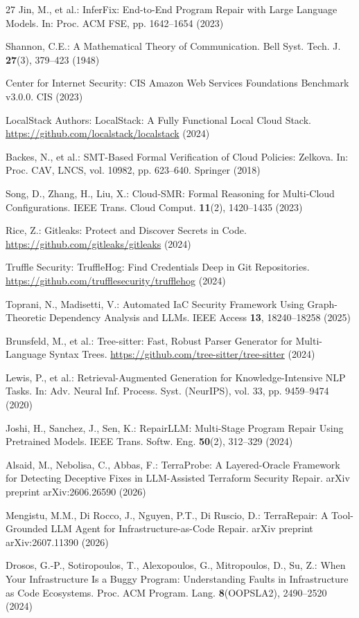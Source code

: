 \documentclass[runningheads]{llncs}
\begin{document}
\begin{thebibliography}{27}
Jin, M., et al.: InferFix: End-to-End Program Repair with Large Language Models. In: Proc. ACM FSE, pp. 1642--1654 (2023)

Shannon, C.E.: A Mathematical Theory of Communication. Bell Syst. Tech. J. \textbf{27}(3), 379--423 (1948)

Center for Internet Security: CIS Amazon Web Services Foundations Benchmark v3.0.0. CIS (2023)

LocalStack Authors: LocalStack: A Fully Functional Local Cloud Stack. \url{https://github.com/localstack/localstack} (2024)

Backes, N., et al.: SMT-Based Formal Verification of Cloud Policies: Zelkova. In: Proc. CAV, LNCS, vol. 10982, pp. 623--640. Springer (2018)

Song, D., Zhang, H., Liu, X.: Cloud-SMR: Formal Reasoning for Multi-Cloud Configurations. IEEE Trans. Cloud Comput. \textbf{11}(2), 1420--1435 (2023)

Rice, Z.: Gitleaks: Protect and Discover Secrets in Code. \url{https://github.com/gitleaks/gitleaks} (2024)

Truffle Security: TruffleHog: Find Credentials Deep in Git Repositories. \url{https://github.com/trufflesecurity/trufflehog} (2024)

Toprani, N., Madisetti, V.: Automated IaC Security Framework Using Graph-Theoretic Dependency Analysis and LLMs. IEEE Access \textbf{13}, 18240--18258 (2025)

Brunsfeld, M., et al.: Tree-sitter: Fast, Robust Parser Generator for Multi-Language Syntax Trees. \url{https://github.com/tree-sitter/tree-sitter} (2024)

Lewis, P., et al.: Retrieval-Augmented Generation for Knowledge-Intensive NLP Tasks. In: Adv. Neural Inf. Process. Syst. (NeurIPS), vol. 33, pp. 9459--9474 (2020)

Joshi, H., Sanchez, J., Sen, K.: RepairLLM: Multi-Stage Program Repair Using Pretrained Models. IEEE Trans. Softw. Eng. \textbf{50}(2), 312--329 (2024)

Alsaid, M., Nebolisa, C., Abbas, F.: TerraProbe: A Layered-Oracle Framework for Detecting Deceptive Fixes in LLM-Assisted Terraform Security Repair. arXiv preprint arXiv:2606.26590 (2026)

Mengistu, M.M., Di Rocco, J., Nguyen, P.T., Di Ruscio, D.: TerraRepair: A Tool-Grounded LLM Agent for Infrastructure-as-Code Repair. arXiv preprint arXiv:2607.11390 (2026)

Drosos, G.-P., Sotiropoulos, T., Alexopoulos, G., Mitropoulos, D., Su, Z.: When Your Infrastructure Is a Buggy Program: Understanding Faults in Infrastructure as Code Ecosystems. Proc. ACM Program. Lang. \textbf{8}(OOPSLA2), 2490--2520 (2024)

\end{thebibliography}
\end{document}
